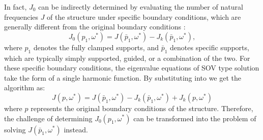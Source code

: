 \documentclass[preprint,12pt]{elsarticle}
\begin{document}
In fact, $ J_0 $ can be indirectly determined by evaluating the number of natural frequencies $ J $ of the structure under specific boundary conditions, which are generally different from the original boundary conditions \cite{han2018improved}:
%
\begin{equation}\label{eq:J_o_pin}
	J_0(p_1,\omega^*) = J(\bar{p}_1,\omega^*) - J_k(\bar{p}_1,\omega^*),
\end{equation}
%
where $ p_1 $ denotes the fully clamped supports, and $ \bar{p}_1 $ denotes specific supports, which are typically simply supported, guided, or a combination of the two.
For these specific boundary conditions, the eigenvalue equations of SOV type solution take the form of a single harmonic function.
By substituting  into  we get the algorithm as:  
%
\begin{equation}\label{eq:new_WWalgorithm}
	J(p,\omega^*) = J(\bar{p}_1,\omega^*) - J_k(\bar{p}_1,\omega^*) + J_k(p,\omega^*)
\end{equation} 
%
where $p$ represents the original boundary conditions of the structure.
Therefore, the challenge of determining $J_0(p_1, \omega^*)$ can be transformed into the problem of solving $ J(\bar{p}_1, \omega^*)$ instead. 
\end{document}
